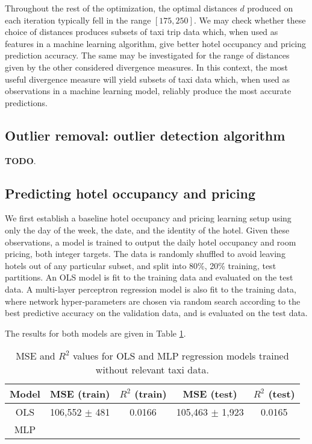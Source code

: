 \documentclass[useAMS, usenatbib]{biom}
\begin{document}
Throughout the rest of the optimization, the optimal distances $d$ produced on each iteration typically fell in the range $[175, 250]$. We may check whether these choice of distances produces subsets of taxi trip data which, when used as features in a machine learning algorithm, give better hotel occupancy and pricing prediction accuracy. The same may be investigated for the range of distances given by the other considered divergence measures. In this context, the most useful divergence measure will yield subsets of taxi data which, when used as observations in a machine learning model, reliably produce the most accurate predictions.

\subsection{Outlier removal: outlier detection algorithm}
\label{ss:outlier_detection}

\textbf{TODO}.

\subsection{Predicting hotel occupancy and pricing}
\label{ss:predicting}

We first establish a baseline hotel occupancy and pricing learning setup using only the day of the week, the date, and the identity of the hotel. Given these observations, a model is trained to output the daily hotel occupancy and room pricing, both integer targets. The data is randomly shuffled to avoid leaving hotels out of any particular subset, and split into 80\%, 20\% training, test partitions. An OLS model is fit to the training data and evaluated on the test data. A multi-layer perceptron regression model is also fit to the training data, where network hyper-parameters are chosen via random search according to the best predictive accuracy on the validation data, and is evaluated on the test data.

The results for both models are given in Table \ref{t:baseline_performance}.

\begin{table}
\caption{MSE and $R^2$ values for OLS and MLP regression models trained without relevant taxi data.}
\label{t:baseline_performance}
\begin{center}
\resizebox{\columnwidth}{!}
{
 \begin{tabular}{||c|c|c|c|c||}
 \hline
 Model & MSE (train) & $R^2$ (train) & MSE (test) & $R^2$ (test) \\
 \hline
 OLS & 106,552 $\pm$ 481 & 0.0166 & 105,463 $\pm$ 1,923 & 0.0165 \\
 MLP &  &  \\
 \hline
\end{tabular}
}
\end{center}
\end{table}
\end{document}
